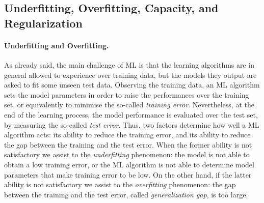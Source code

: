 

\subsection{Underfitting, Overfitting, Capacity,  and Regularization}\label{sec:overfitting}
\paragraph*{Underfitting and Overfitting.} As already said, the main challenge of ML is that the learning algorithms are in general allowed to experience over training data, but the models they output are asked to fit some unseen test data. Observing the training data, an ML algorithm sets the model parameters in order to raise the performances over the training set, or equivalently to minimise the so-called \textit{training error}. Nevertheless, at the end of the learning process, the model performance is evaluated over the test set, by measuring the so-called \textit{test error}. Thus, two factors determine how well a ML algorithm acts: its ability to reduce the training error, and its ability to reduce the gap between the training and the test error. When the former ability is not satisfactory we assist to the \emph{underfitting} phenomenon: the model is not able to obtain a low training error, or the ML algorithm is not able to determine model parameters that make training error to be low. On the other hand, if the latter ability is not satisfactory we assist to the \emph{overfitting} phenomenon: the gap between the training and the test error, called \emph{generalization gap}, is too large. \\

